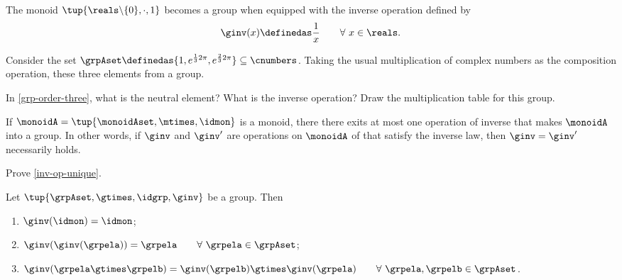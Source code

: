 \begin{example}
The monoid $\tup{\reals \backslash \{ 0 \}, \cdot, 1}$ becomes a group when equipped with the inverse operation defined by
\begin{equation}
\ginv(x) \definedas \frac{1}{x} \quad \quad \forall \ x \in \reals.
\end{equation}
\end{example}

\begin{example}\label{grp-order-three}
Consider the set $\grpAset \definedas \{ 1, e^{\frac{1}{3} 2 \pi}, e^{\frac{2 }{3} 2 \pi}  \} \subseteq \cnumbers$. Taking the usual multiplication of complex numbers as the composition operation, these three elements from a group. 
\end{example}

\begin{gradedexercise}
In \cref{grp-order-three}, what is the neutral element? What is the inverse operation? 
Draw the multiplication table for this group. 
\end{gradedexercise}




\begin{lemma}\label{inv-op-unique}
If $\monoidA = \tup{\monoidAset, \mtimes, \idmon}$ is a monoid, there there exits at most one operation of inverse that makes $\monoidA$ into a group. In other words, if $\ginv$ and $\ginv '$ are operations on $\monoidA$ of that satisfy the inverse law, then  $\ginv = \ginv '$ necessarily holds.  
\end{lemma}


\begin{gradedexercise}
Prove \cref{inv-op-unique}. 
\end{gradedexercise}

\begin{lemma}\label{lemma-inv-op-properties}
Let $\tup{\grpAset, \gtimes, \idgrp, \ginv}$ be a group. Then
\begin{enumerate}
\item\label{eq:group-neutral-invariant} $\ginv(\idmon) = \idmon$;
\item\label{eq:group-inverse-inverse}  $ \ginv(\ginv(\grpela)) = \grpela \quad \quad \forall \  \grpela \in \grpAset$;
\item\label{eq:group-inverse-of-composition} $\ginv(\grpela \gtimes \grpelb ) = \ginv(\grpelb) \gtimes \ginv(\grpela) \quad \quad \forall \ \grpela, \grpelb \in \grpAset$.
\end{enumerate}
\end{lemma}

